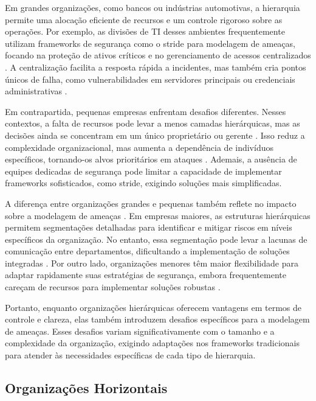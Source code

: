 Em grandes organizações, como bancos ou indústrias automotivas, a
hierarquia permite uma alocação eficiente de recursos e um controle
rigoroso sobre as operações. Por exemplo, as divisões de TI desses
ambientes frequentemente utilizam frameworks de segurança como o
\gls{stride} para modelagem de ameaças, focando na proteção de ativos
críticos e no gerenciamento de acessos centralizados
\cite{MicrosoftThreatModelingTechnique, ThreatModelingASystematicLiteratureReview}.
A centralização facilita a resposta rápida a incidentes, mas também cria pontos únicos de falha,
como vulnerabilidades em servidores principais ou credenciais
administrativas \cite{DoArtifactsHavePolitics}.

Em contrapartida, pequenas empresas enfrentam desafios diferentes. Nesses
contextos, a falta de recursos pode levar a menos camadas hierárquicas, mas
as decisões ainda se concentram em um único proprietário ou gerente \cite{WorkerCooperativesandRevolution}.
Isso reduz a complexidade organizacional, mas aumenta a dependência de
indivíduos específicos, tornando-os alvos prioritários em ataques
\cite{WorkerCooperativesinAmerica}. Ademais, a ausência de equipes
dedicadas de segurança pode limitar a capacidade de implementar frameworks
sofisticados, como \gls{stride}, exigindo soluções mais simplificadas.

A diferença entre organizações grandes e pequenas também reflete no impacto
sobre a modelagem de ameaças \cite{WorkerCooperativesinAmerica, ThreatModelingASummaryOfAvailableMethods}.
Em empresas maiores, as estruturas hierárquicas permitem segmentações detalhadas para identificar e mitigar
riscos em níveis específicos da organização. No entanto, essa segmentação
pode levar a lacunas de comunicação entre departamentos, dificultando a
implementação de soluções integradas
\cite{ThreatModelingASystematicLiteratureReview}. Por outro lado,
organizações menores têm maior flexibilidade para adaptar rapidamente suas
estratégias de segurança, embora frequentemente careçam de recursos para
implementar soluções robustas \cite{WorkerCooperativesandRevolution}.

Portanto, enquanto organizações hierárquicas oferecem vantagens em termos
de controle e clareza, elas também introduzem desafios específicos para a
modelagem de ameaças. Esses desafios variam significativamente com o
tamanho e a complexidade da organização, exigindo adaptações nos frameworks
tradicionais para atender às necessidades específicas de cada tipo de
hierarquia.

\subsection{Organizações Horizontais}
\label{sec:organizacoes_horizontais}


